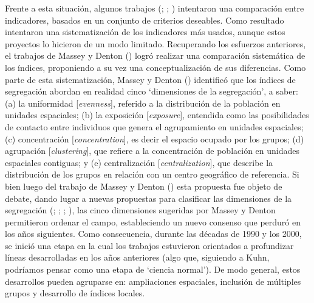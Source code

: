 \documentclass[
  spanish,
  a4paper,%
  chapterprefix=true,%
  DIV=calc,%
  twoside]{scrbook}%
\begin{document}
Frente a esta situación, algunos trabajos (; ; ) intentaron una comparación entre indicadores, basados en
un conjunto de criterios deseables. Como resultado intentaron una
sistematización de los indicadores más usados, aunque estos proyectos lo
hicieron de un modo limitado. Recuperando los esfuerzos anteriores, el
trabajos de Massey y Denton () logró realizar una comparación sistemática de
los índices, proponiendo a su vez una conceptualización de sus
diferencias. Como parte de esta sistematización, Massey y Denton () identificó
que los índices de segregación abordan en realidad cinco `dimensiones de
la segregación', a saber: (a) la uniformidad {[}\emph{evenness}{]}, referido a la
distribución de la población en unidades espaciales; (b) la exposición
{[}\emph{exposure}{]}, entendida como las posibilidades de contacto entre
individuos que genera el agrupamiento en unidades espaciales; (c)
concentración {[}\emph{concentration}{]}, es decir el espacio ocupado por los
grupos; (d) agrupación {[}\emph{clustering}{]}, que refiere a la concentración de
población en unidades espaciales contiguas; y (e) centralización
{[}\emph{centralization}{]}, que describe la distribución de los grupos en
relación con un centro geográfico de referencia.
Si bien luego
del trabajo de Massey y Denton () esta propuesta fue objeto de debate, dando
lugar a nuevas propuestas para clasificar las dimensiones de la
segregación (; ; ; ), las
cinco dimensiones sugeridas por Massey y Denton permitieron ordenar el
campo, estableciendo un nuevo consenso que perduró en los años
siguientes. Como consecuencia, durante las décadas de 1990 y los 2000,
se inició una etapa en la cual los trabajos estuvieron orientados a
profundizar líneas desarrolladas en los años anteriores (algo que,
siguiendo a Kuhn, podríamos pensar como una etapa de `ciencia normal').
De modo general, estos desarrollos pueden agruparse en: ampliaciones
espaciales, inclusión de múltiples grupos y desarrollo de índices
locales.
\end{document}
